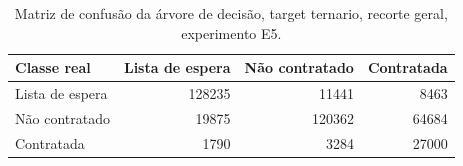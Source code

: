 \begin{table}
\caption{Matriz de confusão da árvore de decisão, target ternario, recorte geral, experimento E5.}
\label{tab:matriz_confusao_treeClassification_19_profundidade_ternario_recorte_geral_holdout_80_20_e5}
\begin{tabular}{lrrr}
\toprule
Classe real & Lista de espera & Não contratado & Contratada \\
\midrule
Lista de espera & 128235 & 11441 & 8463 \\
Não contratado & 19875 & 120362 & 64684 \\
Contratada & 1790 & 3284 & 27000 \\
\bottomrule
\end{tabular}
\end{table}
